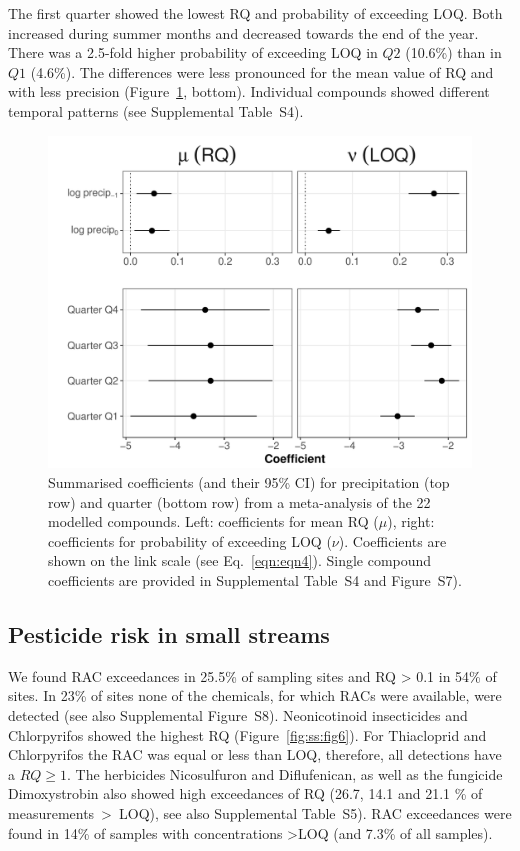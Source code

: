 The first quarter showed the lowest RQ and probability of exceeding LOQ.
Both increased during summer months and decreased towards the end of the year.
There was a 2.5-fold higher probability of exceeding LOQ in $Q2$ (10.6\%) than in $Q1$ (4.6\%).
The differences were less pronounced for the mean value of RQ and with less precision (Figure~\ref{fig:ss:fig5}, bottom). 
Individual compounds showed different temporal patterns (see Supplemental Table~S4). 


\begin{figure}[ht]
  \includegraphics[width=\textwidth]{chapters/smallstreams/figure5.pdf}
  \caption[Summarised coefficients (and their 95\% CI) for precipitation (top row) and quarter (bottom row) from a meta-analysis of the 22 modelled compounds.]{Summarised coefficients (and their 95\% CI) for precipitation (top row) and quarter (bottom row) from a meta-analysis of the 22 modelled compounds. Left: coefficients for mean RQ ($\mu$), right: coefficients for probability of exceeding LOQ ($\nu$). 
  Coefficients are shown on the link scale (see Eq.~\ref{eqn:eqn4}).
  Single compound coefficients are provided in Supplemental Table~S4 and Figure~S7).
  }
  \label{fig:ss:fig5}
\end{figure}



\subsection{Pesticide risk in small streams}
We found RAC exceedances in 25.5\% of sampling sites and RQ > 0.1 in 54\% of sites. 
In 23\% of sites none of the chemicals, for which RACs were available, were detected (see also Supplemental Figure~S8).
Neonicotinoid insecticides and Chlorpyrifos showed the highest RQ (Figure~\ref{fig:ss:fig6}). %
For Thiacloprid and Chlorpyrifos the RAC was equal or less than LOQ, therefore, all detections have a $RQ \ge 1$. 
The herbicides Nicosulfuron and Diflufenican, as well as the fungicide Dimoxystrobin also showed high exceedances of RQ (26.7, 14.1 and 21.1 \% of measurements~\textgreater~LOQ), see also Supplemental Table~S5).
RAC exceedances were found in 14\% of samples with concentrations \textgreater LOQ (and 7.3\% of all samples).

